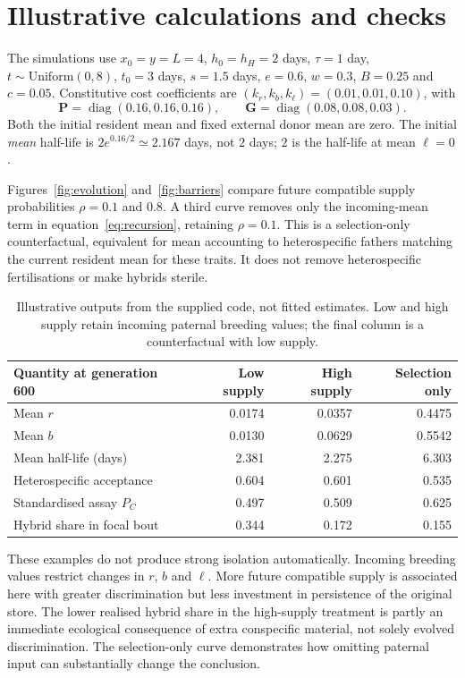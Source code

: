 \documentclass[11pt,a4paper]{article}
\begin{document}
\section{Illustrative calculations and checks}
The simulations use $x_0=y=L=4$, $h_0=h_H=2$ days, $\tau=1$ day, $t\sim\mathrm{Uniform}(0,8)$, $t_0=3$ days, $s=1.5$ days, $e=0.6$, $w=0.3$, $B=0.25$ and $c=0.05$. Constitutive cost coefficients are $(k_r,k_b,k_\ell)=(0.01,0.01,0.10)$, with
\begin{equation}
\mathbf P=\operatorname{diag}(0.16,0.16,0.16),\qquad
\mathbf G=\operatorname{diag}(0.08,0.08,0.03).
\end{equation}
Both the initial resident mean and fixed external donor mean are zero. The initial \emph{mean} half-life is $2e^{0.16/2}\simeq2.167$ days, not $2$ days; $2$ is the half-life at mean $\ell=0$.

Figures~\ref{fig:evolution} and~\ref{fig:barriers} compare future compatible supply probabilities $\rho=0.1$ and $0.8$. A third curve removes only the incoming-mean term in equation~\eqref{eq:recursion}, retaining $\rho=0.1$. This is a selection-only counterfactual, equivalent for mean accounting to heterospecific fathers matching the current resident mean for these traits. It does not remove heterospecific fertilisations or make hybrids sterile.

\begin{table}[htbp]\centering\small
\begin{tabular}{@{}lrrr@{}}\toprule
Quantity at generation 600 & Low supply & High supply & Selection only\\\midrule
Mean $r$ & 0.0174 & 0.0357 & 0.4475\\
Mean $b$ & 0.0130 & 0.0629 & 0.5542\\
Mean half-life (days) & 2.381 & 2.275 & 6.303\\
Heterospecific acceptance & 0.604 & 0.601 & 0.535\\
Standardised assay $P_C$ & 0.497 & 0.509 & 0.625\\
Hybrid share in focal bout & 0.344 & 0.172 & 0.155\\\bottomrule
\end{tabular}
\caption{Illustrative outputs from the supplied code, not fitted estimates. Low and high supply retain incoming paternal breeding values; the final column is a counterfactual with low supply.}
\end{table}

These examples do not produce strong isolation automatically. Incoming breeding values restrict changes in $r$, $b$ and $\ell$. More future compatible supply is associated here with greater discrimination but less investment in persistence of the original store. The lower realised hybrid share in the high-supply treatment is partly an immediate ecological consequence of extra conspecific material, not solely evolved discrimination. The selection-only curve demonstrates how omitting paternal input can substantially change the conclusion.
\end{document}
